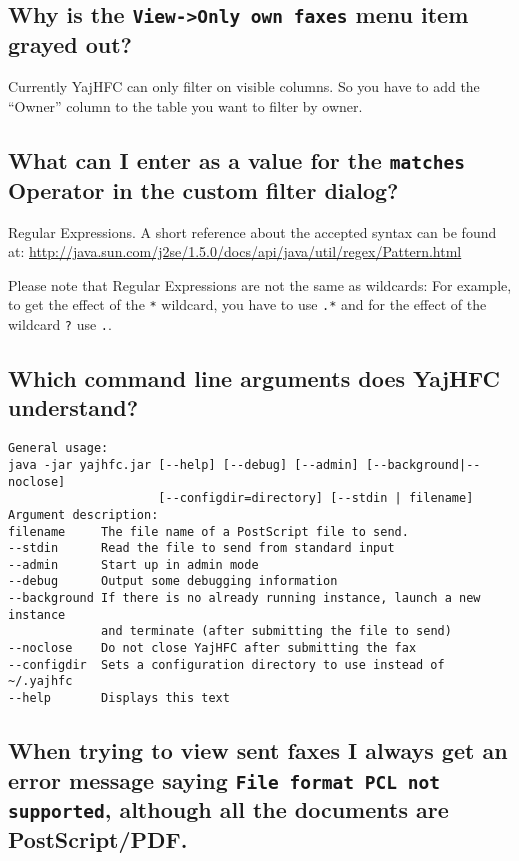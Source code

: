 \documentclass[a4paper,10pt]{scrartcl}
\begin{document}
\subsection{Why is the \texttt{View->Only own faxes} menu item grayed out?}

Currently YajHFC can only filter on visible columns. So you have to add the 
``Owner'' column to the table you want to filter by owner.


\subsection{What can I enter as a value for the \texttt{matches} Operator in the custom filter dialog?}

Regular Expressions. A short reference about the accepted syntax can be found at:
\url{http://java.sun.com/j2se/1.5.0/docs/api/java/util/regex/Pattern.html}

Please note that Regular Expressions are not the same as wildcards: 
For example, to get the effect of the \verb.*. wildcard, you have to use \verb#.*# and 
for the effect of the wildcard \verb#?# use \verb#.#.

\subsection{Which command line arguments does YajHFC understand?}

\begin{verbatim}
General usage:
java -jar yajhfc.jar [--help] [--debug] [--admin] [--background|--noclose] 
                     [--configdir=directory] [--stdin | filename]
Argument description:
filename     The file name of a PostScript file to send.
--stdin      Read the file to send from standard input
--admin      Start up in admin mode
--debug      Output some debugging information
--background If there is no already running instance, launch a new instance
             and terminate (after submitting the file to send)
--noclose    Do not close YajHFC after submitting the fax
--configdir  Sets a configuration directory to use instead of ~/.yajhfc
--help       Displays this text
\end{verbatim}


\subsection{When trying to view sent faxes I always get an error message saying 
   \texttt{File format PCL not supported}, although all the documents are PostScript/PDF.}
\end{document}
